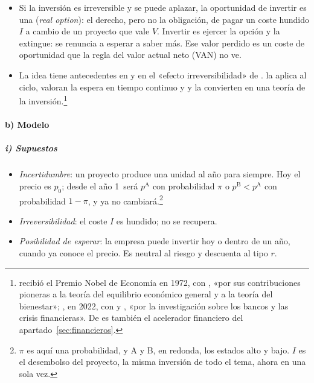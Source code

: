 \documentclass[11pt]{article}
\begin{document}
\begin{itemize}
\item Si la inversión es irreversible y se puede aplazar, la oportunidad de invertir es una  (\emph{real option}): el derecho, pero no la obligación, de pagar un coste hundido $I$ a cambio de un proyecto que vale $V$. Invertir es ejercer la opción y la extingue: se renuncia a esperar a saber más. Ese valor perdido es un coste de oportunidad que la regla del valor actual neto (VAN) no ve.
\item La idea tiene antecedentes en \textcite{Arrow1968Optimal} y en el «efecto irreversibilidad» de \textcite{Henry1974Investment}. \textcite{Bernanke1983Irreversibility} la aplica al ciclo, \textcite{McDonaldSiegel1986Value} valoran la espera en tiempo continuo y \textcite{Pindyck1991Irreversibility} y \textcite{DixitPindyck1994} la convierten en una teoría de la inversión.\footnote{ recibió el Premio Nobel de Economía en 1972, con , «por sus contribuciones pioneras a la teoría del equilibrio económico general y a la teoría del bienestar»\nocite{Nobel1972HicksArrow}; , en 2022, con  y , «por la investigación sobre los bancos y las crisis financieras»\nocite{Nobel2022}. De  es también el acelerador financiero del apartado~\ref{sec:financieros}.}
\end{itemize}

\paragraph{b) Modelo}

\subparagraph{i) Supuestos}

\begin{itemize}
\item \emph{Incertidumbre}: un proyecto produce una unidad al año para siempre. Hoy el precio es $p_0$; desde el año 1~será $p^{\mathrm A}$ con probabilidad $\pi$ o $p^{\mathrm B}<p^{\mathrm A}$ con probabilidad $1-\pi$, y ya no cambiará.\footnote{$\pi$ es aquí una probabilidad, y A y B, en redonda, los estados alto y bajo. $I$ es el desembolso del proyecto, la misma inversión de todo el tema, ahora en una sola vez.}
\item \emph{Irreversibilidad}: el coste $I$ es hundido; no se recupera.
\item \emph{Posibilidad de esperar}: la empresa puede invertir hoy o dentro de un año, cuando ya conoce el precio. Es neutral al riesgo y descuenta al tipo $r$.
\end{itemize}
\end{document}
